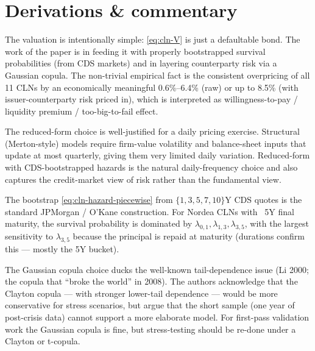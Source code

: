 \documentclass[11pt,a4paper]{article}
\begin{document}
\section{Derivations \& commentary}

\begin{commentary}
The valuation is intentionally simple: \eqref{eq:cln-V} is just a
defaultable bond. The work of the paper is in feeding it with
properly bootstrapped survival probabilities (from CDS markets) and
in layering counterparty risk via a Gaussian copula. The
non-trivial empirical fact is the consistent overpricing of all 11
CLNs by an economically meaningful 0.6\%--6.4\% (raw) or up to 8.5\%
(with issuer-counterparty risk priced in), which is interpreted as
willingness-to-pay / liquidity premium / too-big-to-fail effect.
\end{commentary}

\begin{commentary}
The reduced-form choice is well-justified for a daily pricing
exercise. Structural (Merton-style) models require firm-value
volatility and balance-sheet inputs that update at most quarterly,
giving them very limited daily variation. Reduced-form with
CDS-bootstrapped hazards is the natural daily-frequency choice and
also captures the credit-market view of risk rather than the
fundamental view.
\end{commentary}

\begin{commentary}
The bootstrap \eqref{eq:cln-hazard-piecewise} from $\{1, 3, 5, 7, 10\}$Y
CDS quotes is the standard JPMorgan / O'Kane construction. For Nordea
CLNs with ~5Y final maturity, the survival probability is dominated
by $\lambda_{0,1}, \lambda_{1,3}, \lambda_{3,5}$, with the largest
sensitivity to $\lambda_{3,5}$ because the principal is repaid at
maturity (durations confirm this --- mostly the 5Y bucket).
\end{commentary}

\begin{commentary}
The Gaussian copula choice ducks the well-known tail-dependence issue
(Li 2000; the copula that ``broke the world'' in 2008). The authors
acknowledge that the Clayton copula --- with stronger lower-tail
dependence --- would be more conservative for stress scenarios, but
argue that the short sample (one year of post-crisis data) cannot
support a more elaborate model. For first-pass validation work the
Gaussian copula is fine, but stress-testing should be re-done under
a Clayton or t-copula.
\end{commentary}
\end{document}
